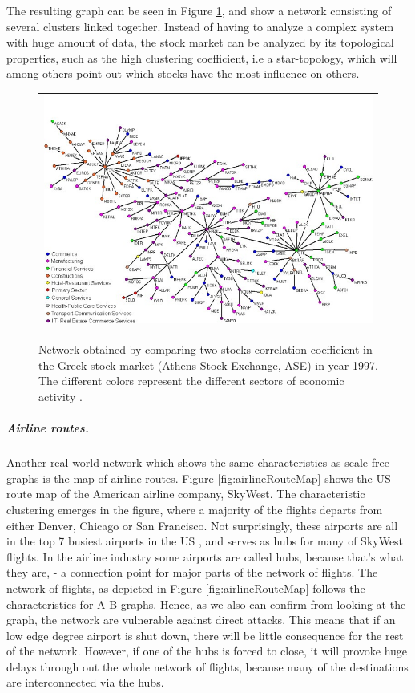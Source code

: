 The resulting graph can be seen in Figure \ref{fig:greekStockMarket}, and show a network consisting of several clusters linked together. Instead of having to analyze a complex system with huge amount of data, the stock market can be analyzed by its topological properties, such as the high clustering coefficient, i.e a star-topology, which will among others point out which stocks have the most influence on others. 
\begin{figure}[h]
\centering
\begin{tabular}{@{}c@{}}
\includegraphics[width=1.0\textwidth]{../Figures/greekStockMarket.jpg}
\end{tabular}
\caption[Caption for LOF]{Network obtained by comparing two stocks correlation coefficient in the Greek stock market (Athens Stock Exchange, ASE) in year 1997. The different colors represent the different sectors of economic activity \cite{greekStockMarket}.
\label{fig:greekStockMarket}}
\end{figure}

\subparagraph{Airline routes.}
Another real world network which shows the same characteristics as scale-free graphs is the map of airline routes. Figure \ref{fig:airlineRouteMap} shows the US route map of the American airline company, SkyWest. The characteristic clustering emerges in the figure, where a majority of the flights departs from either Denver, Chicago or San Francisco. Not surprisingly, these airports are all in the top 7 busiest airports in the US \cite{busiestAirports}, and serves as hubs for many of SkyWest flights. In the airline industry some airports are called hubs, because that's what they are, - a connection point for major parts of the network of flights. The network of flights, as depicted in Figure \ref{fig:airlineRouteMap} follows the characteristics for A-B graphs. Hence, as we also can confirm from looking at the graph, the network are vulnerable against direct attacks. This means that if an low edge degree airport is shut down, there will be little consequence for the rest of the network. However, if one of the hubs is forced to close, it will provoke huge delays through out the whole network of flights, because many of the destinations are interconnected via the hubs. 


